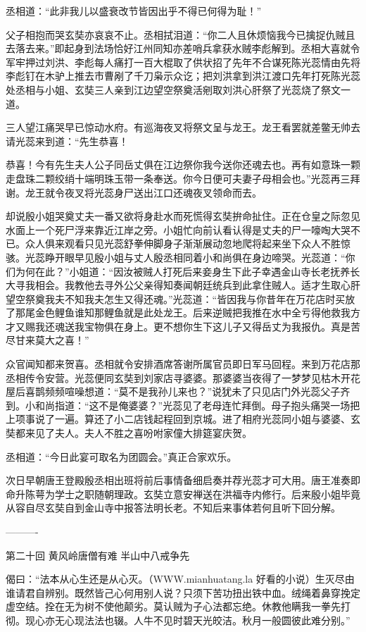 \documentclass[12pt,UTF8]{ctexbook}
\begin{document}
丞相道：“此非我儿以盛衰改节皆因出乎不得已何得为耻！”

父子相抱而哭玄奘亦哀哀不止。丞相拭泪道：“你二人且休烦恼我今已擒捉仇贼且去落去来。”即起身到法场恰好江州同知亦差哨兵拿获水贼李彪解到。丞相大喜就令军牢押过刘洪、李彪每人痛打一百大棍取了供状招了先年不合谋死陈光蕊情由先将李彪钉在木驴上推去市曹剐了千刀枭示众讫；把刘洪拿到洪江渡口先年打死陈光蕊处丞相与小姐、玄奘三人亲到江边望空祭奠活剜取刘洪心肝祭了光蕊烧了祭文一道。

三人望江痛哭早已惊动水府。有巡海夜叉将祭文呈与龙王。龙王看罢就差鳖无帅去请光蕊来到道：“先生恭喜！

恭喜！今有先生夫人公子同岳丈俱在江边祭你我今送你还魂去也。再有如意珠一颗走盘珠二颗绞绡十端明珠玉带一条奉送。你今日便可夫妻子母相会也。”光蕊再三拜谢。龙王就令夜叉将光蕊身尸送出江口还魂夜叉领命而去。

却说殷小姐哭奠丈夫一番又欲将身赴水而死慌得玄奘拚命扯住。正在仓皇之际忽见水面上一个死尸浮来靠近江岸之旁。小姐忙向前认看认得是丈夫的尸一嚎啕大哭不已。众人俱来观看只见光蕊舒拳伸脚身子渐渐展动忽地爬将起来坐下众人不胜惊骇。光蕊睁开眼早见殷小姐与丈人殷丞相同着小和尚俱在身边啼哭。光蕊道：“你们为何在此？”小姐道：“因汝被贼人打死后来妾身生下此子幸遇金山寺长老抚养长大寻我相会。我教他去寻外公父亲得知奏闻朝廷统兵到此拿住贼人。适才生取心肝望空祭奠我夫不知我夫怎生又得还魂。”光蕊道：“皆因我与你昔年在万花店时买放了那尾金色鲤鱼谁知那鲤鱼就是此处龙王。后来逆贼把我推在水中全亏得他救我方才又赐我还魂送我宝物俱在身上。更不想你生下这儿子又得岳丈为我报仇。真是苦尽甘来莫大之喜！”

众官闻知都来贺喜。丞相就令安排酒席答谢所属官员即日军马回程。来到万花店那丞相传令安营。光蕊便同玄奘到刘家店寻婆婆。那婆婆当夜得了一梦梦见枯木开花屋后喜鹊频频喧噪想道：“莫不是我孙儿来也？”说犹未了只见店门外光蕊父子齐到。小和尚指道：“这不是俺婆婆？”光蕊见了老母连忙拜倒。母子抱头痛哭一场把上项事说了一遍。算还了小二店钱起程回到京城。进了相府光蕊同小姐与婆婆、玄奘都来见了夫人。夫人不胜之喜吩咐家僮大排筵宴庆贺。

丞相道：“今日此宴可取名为团圆会。”真正合家欢乐。

次日早朝唐王登殿殷丞相出班将前后事情备细启奏并荐光蕊才可大用。唐王准奏即命升陈萼为学士之职随朝理政。玄奘立意安禅送在洪福寺内修行。后来殷小姐毕竟从容自尽玄奘自到金山寺中报答法明长老。不知后来事体若何且听下回分解。


----------

第二十回 黄风岭唐僧有难 半山中八戒争先

偈曰：“法本从心生还是从心灭。（WWW.mianhuatang.la 好看的小说）生灭尽由谁请君自辨别。既然皆己心何用别人说？只须下苦功扭出铁中血。绒绳着鼻穿挽定虚空结。拴在无为树不使他颠劣。莫认贼为子心法都忘绝。休教他瞒我一拳先打彻。现心亦无心现法法也辍。人牛不见时碧天光皎洁。秋月一般圆彼此难分别。”
\end{document}
